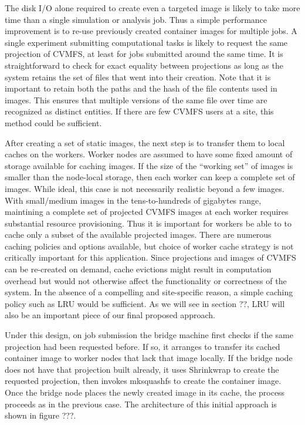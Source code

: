 \documentclass[sigconf]{acmart}
\begin{document}
The disk I/O alone required to create even a targeted image is likely to take more time than a single simulation or analysis job.
Thus a simple performance improvement is to re-use previously created container images for multiple jobs.
A single experiment submitting computational tasks is likely to request the same projection of CVMFS,
at least for jobs submitted around the same time.
It is straightforward to check for exact equality between projections as long as the system retains the set of files that went into their creation.
Note that it is important to retain both the paths and the hash of the file contents used in images.
This ensures that multiple versions of the same file over time are recognized as distinct entities.
If there are few CVMFS users at a site,
this method could be sufficient.

After creating a set of static images,
the next step is to transfer them to local caches on the workers.
Worker nodes are assumed to have some fixed amount of storage available for caching images.
If the size of the ``working set'' of images is smaller than the node-local storage,
then each worker can keep a complete set of images.
While ideal, this case is not necessarily realistic beyond a few images.
With small/medium images in the tens-to-hundreds of gigabytes range,
maintining a complete set of projected CVMFS images at each worker requires substantial resource provisioning.
Thus it is important for workers be able to to cache only a subset of the available projected images.
There are numerous caching policies and options available,
but choice of worker cache strategy is not critically important for this application.
Since projections and images of CVMFS can be re-created on demand,
cache evictions might result in computation overhead but would not otherwise affect the functionality or correctness of the system.
In the absence of a compelling and site-specific reason,
a simple caching policy such as LRU would be sufficient.
As we will see in section ??,
LRU will also be an important piece of our final proposed approach.

Under this design,
on job submission the bridge machine first checks if the same projection had been requested before.
If so, it arranges to transfer its cached container image to worker nodes that lack that image locally.
If the bridge node does not have that projection built already,
it uses Shrinkwrap to create the requested projection,
then invokes mksquashfs to create the container image.
Once the bridge node places the newly created image in its cache,
the process proceeds as in the previous case.
The architecture of this initial approach is shown in figure ???.
\end{document}
